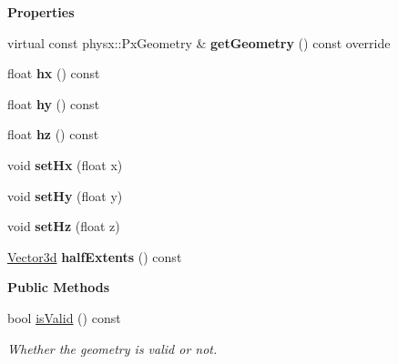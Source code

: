 \begin{Indent}\textbf{ Properties}\par
\begin{DoxyCompactItemize}
\item 
\mbox{\label{classrev_1_1_box_geometry_a41a78aae08dd587e9216f3bd1ecc4eec}} 
virtual const physx\+::\+Px\+Geometry \& {\bfseries get\+Geometry} () const override
\item 
\mbox{\label{classrev_1_1_box_geometry_a5e21d678924afe0f2948a44c653d53d0}} 
float {\bfseries hx} () const
\item 
\mbox{\label{classrev_1_1_box_geometry_a1bfe6d6264b2b79e578ddc589eeabd13}} 
float {\bfseries hy} () const
\item 
\mbox{\label{classrev_1_1_box_geometry_a128c7b4204790149a363feb2985fc150}} 
float {\bfseries hz} () const
\item 
\mbox{\label{classrev_1_1_box_geometry_a3cecc300cc560032d0c0f0a1855b0f4d}} 
void {\bfseries set\+Hx} (float x)
\item 
\mbox{\label{classrev_1_1_box_geometry_a65f3e40394432a5f58411eac2b388065}} 
void {\bfseries set\+Hy} (float y)
\item 
\mbox{\label{classrev_1_1_box_geometry_aed6dab340922de11bfd16cb8c5292050}} 
void {\bfseries set\+Hz} (float z)
\item 
\mbox{\label{classrev_1_1_box_geometry_a2ab6d5f58610eca8312f0c07f8ee9559}} 
\mbox{\hyperlink{classrev_1_1_vector}{Vector3d}} {\bfseries half\+Extents} () const
\end{DoxyCompactItemize}
\end{Indent}
\begin{Indent}\textbf{ Public Methods}\par
\begin{DoxyCompactItemize}
\item 
\mbox{\label{classrev_1_1_box_geometry_a499d1d55261c8490751b9a6cd1b46c40}} 
bool \mbox{\hyperlink{classrev_1_1_box_geometry_a499d1d55261c8490751b9a6cd1b46c40}{is\+Valid}} () const
\begin{DoxyCompactList}\small\item\em Whether the geometry is valid or not. \end{DoxyCompactList}\end{DoxyCompactItemize}
\end{Indent}
